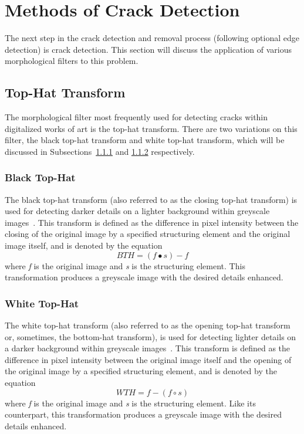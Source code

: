 \documentclass{sig-alternate}
\begin{document}
\section{Methods of Crack Detection}\label{crack detection}
The next step in the crack detection and removal process (following optional edge detection) is crack detection. This section will discuss the application of various morphological filters to this problem.

\subsection{Top-Hat Transform}
The morphological filter most frequently used for detecting cracks within digitalized works of art is the top-hat transform. There are two variations on this filter, the black top-hat transform and white top-hat transform, which will be discussed in Subsections~\ref{black top-hat} and \ref{white top-hat} respectively.

\subsubsection{Black Top-Hat}\label{black top-hat}
The black top-hat transform (also referred to as the closing top-hat transform) is used for detecting darker details on a lighter background within greyscale images~\cite{Altarpiece:2013, TopHat:2010}. This transform is defined as the difference in pixel intensity between the closing of the original image by a specified structuring element and the original image itself, and is denoted by the equation
\begin{equation*}
BTH = (f \bullet s) - f
\end{equation*}
where \textit{f} is the original image and \textit{s} is the structuring element. This transformation produces a greyscale image with the desired details enhanced.

\subsubsection{White Top-Hat}\label{white top-hat}
The white top-hat transform (also referred to as the opening top-hat transform or, sometimes, the bottom-hat transform), is used for detecting lighter details on a darker background within greyscale images~\cite{Altarpiece:2013, TopHat:2010}. This transform is defined as the difference in pixel intensity between the original image itself and the opening of the original image by a specified structuring element, and is denoted by the equation
\begin{equation*}
WTH = f - (f \circ s)
\end{equation*}
where \textit{f} is the original image and \textit{s} is the structuring element. Like its counterpart, this transformation produces a greyscale image with the desired details enhanced.
\end{document}
